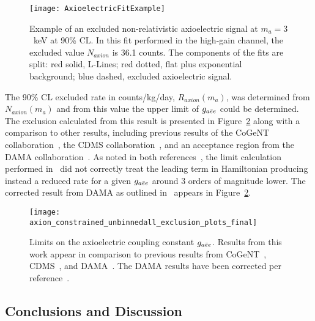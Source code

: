 		\begin{figure}
			\centering
			\texttt{[image: AxioelectricFitExample]}
			\caption[Example of an excluded non-relativistic axioelectric signal at $m_{a}=3$~keV at 
			90\% CL]{Example of an excluded non-relativistic axioelectric signal at $m_{a}=3$~keV at 
			90\% CL.  In this fit performed in the high-gain channel, the excluded value $N_{axion}$ 
			is 36.1 counts.  
			The components of the fits are split: red solid, L-Lines; red dotted, flat plus exponential
			background; blue dashed, excluded axioelectric signal.}
			\label{fig:ExampleHeavyAxionFit}
		\end{figure}
			
	The 90\% CL excluded rate in counts/kg/day, $R_{axion}(m_{a})$, was determined from $N_{axion}(m_{a})$ and from this value the upper limit of $\gaa$ could be determined.  The exclusion calculated from this result is presented in Figure~\ref{fig:HeavyAxionLimits} along with a comparison to other results, including previous results of the CoGeNT collaboration~\cite{Aalseth:2008aa}, the CDMS collaboration~\cite{Ahmed2009}, and an acceptance region from the DAMA collaboration~\cite{Bernabei:2005ca}.  As noted in both references~\cite{Collar:2009sp,Pospelov:2008jk}, the limit calculation performed in~\cite{Bernabei:2005ca} did not correctly treat the leading term in Hamiltonian producing instead a reduced rate for a given $\gaa$ around 3 orders of magnitude lower.  The corrected result from DAMA as outlined in~\cite{Collar:2009sp} appears in Figure~\ref{fig:HeavyAxionLimits}.
			
		\begin{figure}
			\centering
			\texttt{[image: axion\_constrained\_unbinnedall\_exclusion\_plots\_final]}
			\caption[Limits on the axioelectric coupling constant $\gaa$]{Limits on the axioelectric 
			coupling constant $\gaa$.  Results from this work appear in comparison to previous 
			results from CoGeNT~\cite{Aalseth:2008aa}, CDMS~\cite{Ahmed2009}, and 
			DAMA~\cite{Bernabei:2005ca}.  The DAMA results have been corrected per 
			reference~\cite{Collar:2009sp}.}
			\label{fig:HeavyAxionLimits}
		\end{figure}
		
	\subsection{Conclusions and Discussion}
	\label{sec:DiscOnHeavyAxionLimits}	


